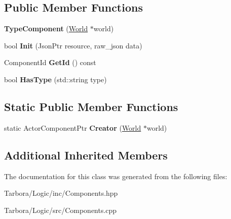 \subsection*{Public Member Functions}
\begin{DoxyCompactItemize}
\item 
\mbox{\label{classTarbora_1_1TypeComponent_ada8807ff45fd75e2d5d877dd3d85003c}} 
{\bfseries Type\+Component} (\hyperlink{classTarbora_1_1World}{World} $\ast$world)
\item 
\mbox{\label{classTarbora_1_1TypeComponent_afd1c07d89bb8f9e0967a6d5edf27a0ed}} 
bool {\bfseries Init} (Json\+Ptr resource, raw\+\_\+json data)
\item 
\mbox{\label{classTarbora_1_1TypeComponent_aade2d0d80463189c39fe6b8c094afdad}} 
Component\+Id {\bfseries Get\+Id} () const
\item 
\mbox{\label{classTarbora_1_1TypeComponent_a79528bf8a263bb1e40a9d0de234e11d1}} 
bool {\bfseries Has\+Type} (std\+::string type)
\end{DoxyCompactItemize}
\subsection*{Static Public Member Functions}
\begin{DoxyCompactItemize}
\item 
\mbox{\label{classTarbora_1_1TypeComponent_ad8d82b6a8350c0f4de4fa289d92f6a50}} 
static Actor\+Component\+Ptr {\bfseries Creator} (\hyperlink{classTarbora_1_1World}{World} $\ast$world)
\end{DoxyCompactItemize}
\subsection*{Additional Inherited Members}


The documentation for this class was generated from the following files\+:\begin{DoxyCompactItemize}
\item 
Tarbora/\+Logic/inc/Components.\+hpp\item 
Tarbora/\+Logic/src/Components.\+cpp\end{DoxyCompactItemize}
